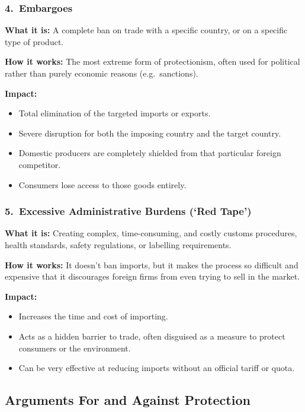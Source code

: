 \documentclass[11pt, a4paper, twoside]{book}
\begin{document}
\subsubsection{4.\ Embargoes}

\textbf{What it is:} A complete ban on trade with a specific country, or on a specific type of product.

\textbf{How it works:} The most extreme form of protectionism, often used for political rather than purely economic reasons (e.g.\ sanctions).

\textbf{Impact:}
\begin{itemize}
  \item Total elimination of the targeted imports or exports.
  \item Severe disruption for both the imposing country and the target country.
  \item Domestic producers are completely shielded from that particular foreign competitor.
  \item Consumers lose access to those goods entirely.
\end{itemize}

\subsubsection{5.\ Excessive Administrative Burdens (`Red Tape')}

\textbf{What it is:} Creating complex, time-consuming, and costly customs procedures, health standards, safety regulations, or labelling requirements.

\textbf{How it works:} It doesn't ban imports, but it makes the process so difficult and expensive that it discourages foreign firms from even trying to sell in the market.

\textbf{Impact:}
\begin{itemize}
  \item Increases the time and cost of importing.
  \item Acts as a hidden barrier to trade, often disguised as a measure to protect consumers or the environment.
  \item Can be very effective at reducing imports without an official tariff or quota.
\end{itemize}

\subsection{Arguments For and Against Protection}
\end{document}
